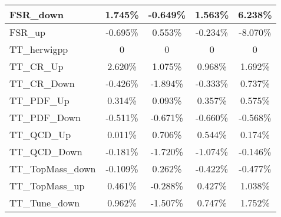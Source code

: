 \begin{table}[]
{\begin{tabular}{|l|c|c|c|c|}
FSR\_down                                & 1.745\%                                   & -0.649\%                                  & 1.563\%                                 & 6.238\%                                  \\ \hline
FSR\_up                                  & -0.695\%                                     & 0.553\%                                    & -0.234\%                                   & -8.070\%                                    \\ \hline 
TT\_herwigpp                      & 0                       & 0                       & 0                      & 0                       \\ \hline         
TT\_CR\_Up                         & 2.620\%                          & 1.075\%                          & 0.968\%                         & 1.692\%                           \\ \hline        
TT\_CR\_Down                       & -0.426\%                        & -1.894\%                        & -0.333\%                       & 0.737\%                           \\ \hline        
TT\_PDF\_Up                        & 0.314\%                         & 0.093\%                         & 0.357\%                        & 0.575\%                       \\ \hline    
TT\_PDF\_Down                      & -0.511\%                       & -0.671\%                       & -0.660\%                      & -0.568\%                       \\ \hline    
TT\_QCD\_Up                        & 0.011\%                         & 0.706\%                         & 0.544\%                        & 0.174\%                       \\ \hline    
TT\_QCD\_Down                      & -0.181\%                       & -1.720\%                       & -1.074\%                      & -0.146\%                       \\ \hline    
TT\_TopMass\_down                      & -0.109\%                       & 0.262\%                       & -0.422\%                      & -0.477\%                       \\ \hline    
TT\_TopMass\_up                      & 0.461\%                       & -0.288\%                       & 0.427\%                      & 1.038\%                       \\ \hline        
TT\_Tune\_down            & 0.962\%             & -1.507\%             & 0.747\%            & 1.752\%             \\ \hline      

\end{tabular}}
\end{table}
